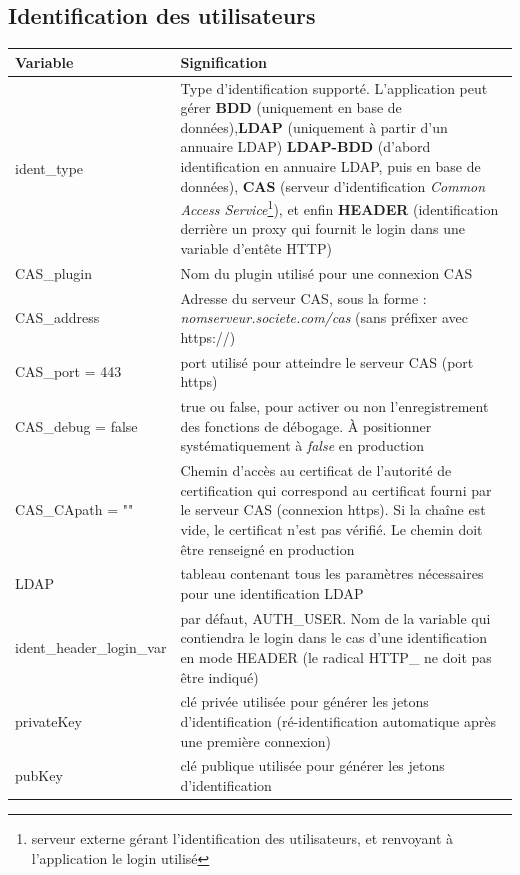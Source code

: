 \subsection{Identification des utilisateurs}

\begin{longtable}{|p{6cm}|p{10cm}|}
\hline
\textbf{Variable} & \textbf{Signification} \\
\hline
\endhead
ident\_type & Type d'identification supporté. L'application peut gérer \textbf{BDD} (uniquement en base de données),\textbf{LDAP} (uniquement à partir d'un annuaire LDAP) \textbf{LDAP-BDD} (d'abord identification en annuaire LDAP, puis en base de données), \textbf{CAS} (serveur d'identification \textit{Common Access Service}\footnote{serveur externe gérant l'identification des utilisateurs, et renvoyant à l'application le login utilisé}), et enfin \textbf{HEADER} (identification derrière un proxy qui fournit le login dans une variable d'entête HTTP)\\
\hline
CAS\_plugin & Nom du plugin utilisé pour une connexion CAS \\
\hline
CAS\_address & Adresse du serveur CAS, sous la forme : \textit{nomserveur.societe.com/cas} (sans préfixer avec https://)\\
\hline
CAS\_port = 443 & port utilisé pour atteindre le serveur CAS (port https)\\
\hline
CAS\_debug = false & true ou false, pour activer ou non l'enregistrement des fonctions de débogage. À positionner systématiquement à \textit{false} en production \\
\hline
CAS\_CApath = "" & Chemin d'accès au certificat de l'autorité de certification qui correspond au certificat fourni par le serveur CAS (connexion https). Si la chaîne est vide, le certificat n'est pas vérifié. Le chemin doit être renseigné en production \\
\hline
LDAP & tableau contenant tous les paramètres nécessaires pour une identification LDAP \\
\hline
ident\_header\_login\_var & par défaut, AUTH\_USER. Nom de la variable qui contiendra le login dans le cas d'une identification en mode HEADER (le radical HTTP\_  ne doit pas être indiqué) \\
\hline
privateKey & clé privée utilisée pour générer les jetons d'identification (ré-identification automatique après une première connexion) \\
\hline
pubKey & clé publique utilisée pour générer les jetons d'identification \\

\end{longtable}
